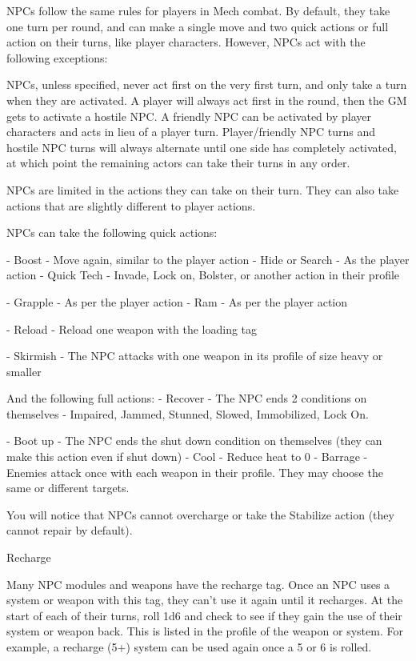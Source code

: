NPCs follow the same rules for players in Mech combat. By default, they take one turn per
round, and can make a single move and two quick actions or full action on their turns, like
player characters. However, NPCs act with the following exceptions:


NPCs, unless specified, never act first on the very first turn, and only take a turn when they
are activated. A player will always act first in the round, then the GM gets to activate a hostile
NPC. A friendly NPC can be activated by player characters and acts in lieu of a player turn.
Player/friendly NPC turns and hostile NPC turns will always alternate until one side has
completely activated, at which point the remaining actors can take their turns in any order.




NPCs are limited in the actions they can take on their turn. They can also take actions that
are slightly different to player actions.

NPCs can take the following quick actions:

             -   Boost - Move again, similar to the player action
             -   Hide or Search - As the player action
             -   Quick Tech - Invade, Lock on, Bolster, or another action in their profile

             -   Grapple - As per the player action
             -   Ram - As per the player action

             -   Reload - Reload one weapon with the loading tag

             -   Skirmish - The NPC attacks with one weapon in its profile of size heavy or smaller

And the following full actions:
             -   Recover - The NPC ends 2 conditions on themselves - Impaired, Jammed,
                 Stunned, Slowed, Immobilized, Lock On.

             -   Boot up - The NPC ends the shut down condition on themselves (they can make
                 this action even if shut down)
             -   Cool - Reduce heat to 0
             -   Barrage - Enemies attack once with each weapon in their profile. They may
                 choose the same or different targets.

You will notice that NPCs cannot overcharge or take the Stabilize action (they cannot repair by
default).

                                                   Recharge

Many NPC modules and weapons have the recharge tag. Once an NPC uses a system or
weapon with this tag, they can't use it again until it recharges. At the start of each of their turns,
roll 1d6 and check to see if they gain the use of their system or weapon back. This is listed in the
profile of the weapon or system. For example, a recharge (5+) system can be used again once a
5 or 6 is rolled.


